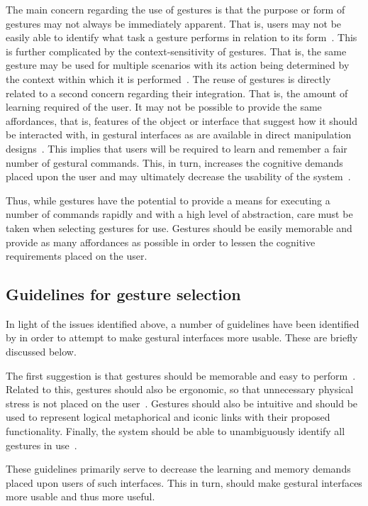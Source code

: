 The main concern regarding the use of gestures is that the purpose or form of gestures may not always be immediately apparent. That is, users may not be easily able to identify what task a gesture performs in relation to its form~\citep{Wobb09}. This is further complicated by the context-sensitivity of gestures. That is, the same gesture may be used for multiple scenarios with its action being determined by the context within which it is performed~\citep{Wobb09}. The reuse of gestures is directly related to a second concern regarding their integration. That is, the amount of learning required of the user. It may not be possible to provide the same affordances, that is, features of the object or interface that suggest how it should be interacted with, in gestural interfaces as are available in direct manipulation designs~\citep{Niel04}. This implies that users will be required to learn and remember a fair number of gestural commands. This, in turn, increases the cognitive demands placed upon the user and may ultimately decrease the usability of the system~\citep{Niel04}.

Thus, while gestures have the potential to provide a means for executing a number of commands rapidly and with a high level of abstraction, care must be taken when selecting gestures for use. Gestures should be easily memorable and provide as many affordances as possible in order to lessen the cognitive requirements placed on the user.

\subsection{Guidelines for gesture selection}
In light of the issues identified above, a number of guidelines have been identified by \citet{Niel04} in order to attempt to make gestural interfaces more usable. These are briefly discussed below.

The first suggestion is that gestures should be memorable and easy to perform~\citep{Niel04}. Related to this, gestures should also be ergonomic, so that unnecessary physical stress is not placed on the user~\citep{Wobb09}. Gestures should also be intuitive and should be used to represent logical metaphorical and iconic links with their proposed functionality. Finally, the system should be able to unambiguously identify all gestures in use~\citep{Jaim07}.

These guidelines primarily serve to decrease the learning and memory demands placed upon users of such interfaces. This in turn, should make gestural interfaces more usable and thus more useful.

